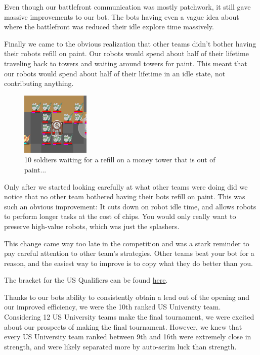 \medskip

Even though our battlefront communication was mostly patchwork, it still gave massive improvements to our bot. The bots having even a vague idea about where the battlefront was reduced their idle explore time massively.

\medskip

Finally we came to the obvious realization that other teams didn't bother having their robots refill on paint. Our robots would spend about half of their lifetime traveling back to towers and waiting around towers for paint. This meant that our robots would spend about half of their lifetime in an idle state, not contributing anything.

\medskip

\begin{figure}[h]
    \centering
    \includegraphics[scale=1]{images/waiting_for_refill.png}
    \caption{10 soldiers waiting for a refill on a money tower that is out of paint...}
\end{figure}

Only after we started looking carefully at what other teams were doing did we notice that no other team bothered having their bots refill on paint. This was such an obvious improvement: It cuts down on robot idle time, and allows robots to perform longer tasks at the cost of chips. You would only really want to preserve high-value robots, which was just the splashers.

\medskip

This change came way too late in the competition and was a stark reminder to pay careful attention to other team's strategies. Other teams beat your bot for a reason, and the easiest way to improve is to copy what they do better than you.


The bracket for the US Qualifiers can be found \href{https://challonge.com/bc25javausquals}{here}.

\medskip

Thanks to our bots ability to consistently obtain a lead out of the opening and our improved efficiency, we were the 10th ranked US University team. Considering 12 US University teams make the final tournament, we were excited about our prospects of making the final tournament. However, we knew that every US University team ranked between 9th and 16th were extremely close in strength, and were likely separated more by auto-scrim luck than strength.

